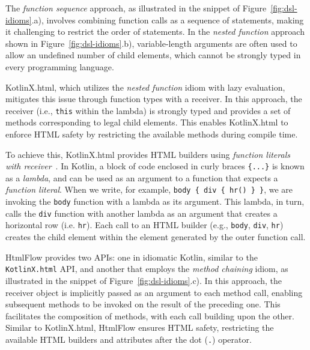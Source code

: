 The \textit{function sequence} approach, as illustrated in the snippet of
Figure~\ref{fig:dsl-idioms}.a), involves combining function calls as a sequence
of statements, making it challenging to restrict the order of statements. In
the \textit{nested function} approach shown in Figure~\ref{fig:dsl-idioms}.b),
variable-length arguments are often used to allow an undefined number of child
elements, which cannot be strongly typed in every programming language.

KotlinX.html, which utilizes the \textit{nested function} idiom with lazy
evaluation, mitigates this issue through function types with a receiver. In
this approach, the receiver (i.e., \texttt{this} within the lambda) is strongly
typed and provides a set of methods corresponding to legal child elements. This
enables KotlinX.html to enforce HTML safety by restricting the available
methods during compile time.

To achieve this, KotlinX.html provides HTML builders using \textit{function
  literals with receiver}~\cite{kotlinlang}. In Kotlin, a block of code enclosed
in curly braces \texttt{\{...\}} is known as a \emph{lambda}, and can be used
as an argument to a function that expects a \emph{function literal}. When we
write, for example, \texttt{body \{ div \{ hr() \} \}}, we are invoking the
\texttt{body} function with a lambda as its argument. This lambda, in turn,
calls the \texttt{div} function with another lambda as an argument that creates
a horizontal row (i.e. \texttt{hr}). Each call to an HTML builder (e.g.,
\texttt{body}, \texttt{div}, \texttt{hr}) creates the child element within the
element generated by the outer function call.

HtmlFlow provides two APIs: one in idiomatic Kotlin, similar to the
\texttt{KotlinX.html} API, and another that employs the \textit{method
  chaining} idiom, as illustrated in the snippet of
Figure~\ref{fig:dsl-idioms}.c). In this approach, the receiver object is
implicitly passed as an argument to each method call, enabling subsequent
methods to be invoked on the result of the preceding one. This facilitates the
composition of methods, with each call building upon the other. Similar to
KotlinX.html, HtmlFlow ensures HTML safety, restricting the available HTML
builders and attributes after the dot (\texttt{.}) operator.


